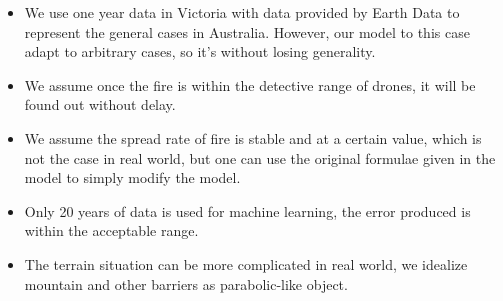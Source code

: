 \documentclass[../main.tex]{subfiles}
\begin{document}
\begin{itemize}
  \item
    We use one year data in Victoria with data provided by Earth Data to
    represent the general cases in Australia. However, our model to this
    case adapt to arbitrary cases, so it's without losing generality.
  \item
    We assume once the fire is within the detective range of drones, it
    will be found out without delay.
  \item
    We assume the spread rate of fire is stable and at a certain value,
    which is not the case in real world, but one can use the original
    formulae given in the model to simply modify the model.
  \item
    Only 20 years of data is used for machine learning, the error produced
    is within the acceptable range.
  \item
    The terrain situation can be more complicated in real world, we
    idealize mountain and other barriers as parabolic-like object.
  \end{itemize}
\end{document}
